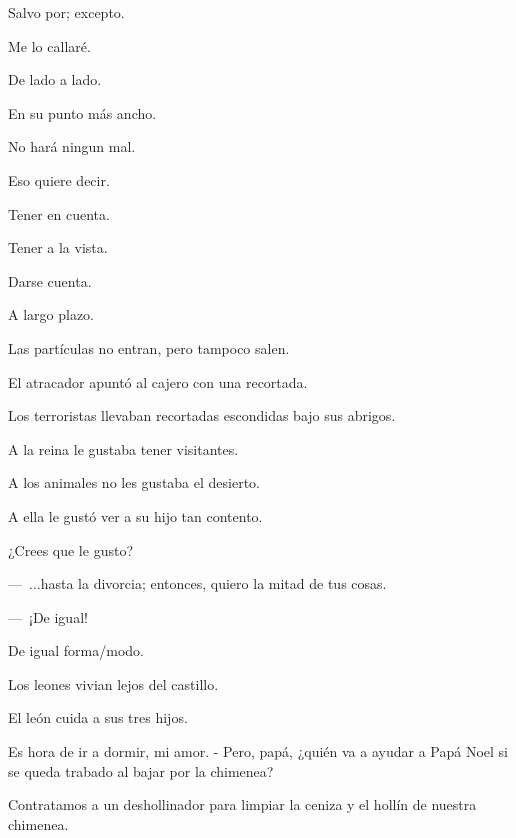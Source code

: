 \sk
Salvo por; excepto. 

\sk
Me lo callaré. 

\sk
De lado a lado.

\sk
En su punto más ancho. 

\sk
No hará ningun mal. 


\sk
Eso quiere decir. 

\sk
Tener en cuenta. 

\sk
Tener a la vista. 

\sk
Darse cuenta. 

\sk
A largo plazo. 

\sk
Las partículas no entran, pero tampoco salen. 

\sk
El atracador apuntó al cajero con una recortada. 

\sk
Los terroristas llevaban recortadas escondidas bajo sus abrigos. 

\sk
A la reina le gustaba tener visitantes.

\sk
A los animales no les gustaba el desierto. 

\sk
A ella le gustó ver a su hijo tan contento. 

\sk
¿Crees que le gusto? 

\sk
---~...hasta la divorcia; entonces, quiero la mitad de tus cosas.

---~¡De igual! 

\sk
De igual forma/modo. 

\sk
Los leones vivian lejos del castillo.

\sk
El león cuida a sus tres hijos.

\sk
Es hora de ir a dormir, mi amor. - Pero, papá, ¿quién va a ayudar a Papá Noel si se queda trabado al bajar por la chimenea? 

\sk
Contratamos a un deshollinador para limpiar la ceniza y el hollín de nuestra chimenea. 

